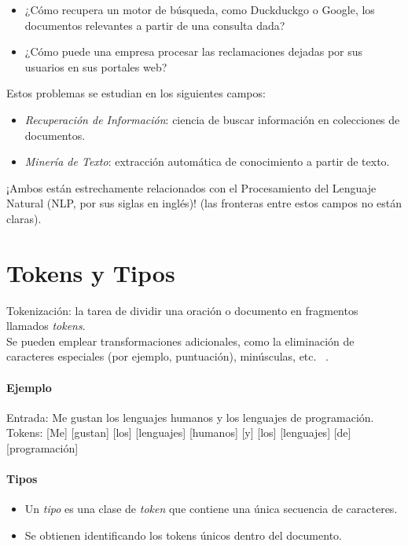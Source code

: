 
\begin{itemize}
   \item ¿Cómo recupera un motor de búsqueda, como Duckduckgo o Google, los documentos relevantes a partir de una consulta dada?
   \item ¿Cómo puede una empresa procesar las reclamaciones dejadas por sus usuarios en sus portales web?
\end{itemize}

Estos problemas se estudian en los siguientes campos:

\begin{itemize}
   \item \emph{Recuperación de Información}: ciencia de buscar información en colecciones de documentos.
   \item \emph{Minería de Texto}: extracción automática de conocimiento a partir de texto.
\end{itemize}

¡Ambos están estrechamente relacionados con el Procesamiento del Lenguaje Natural (NLP, por sus siglas en inglés)! (las fronteras entre estos campos no están claras).

\section{Tokens y Tipos}

Tokenización: la tarea de dividir una oración o documento en fragmentos llamados \emph{tokens}. \\
Se pueden emplear transformaciones adicionales, como la eliminación de caracteres especiales (por ejemplo, puntuación), minúsculas, etc. ~\cite{manning2008}.

\paragraph{Ejemplo}
Entrada: Me gustan los lenguajes humanos y los lenguajes de programación.\\
Tokens: [Me] [gustan] [los] [lenguajes] [humanos] [y] [los] [lenguajes] [de] [programación]


\paragraph{Tipos}
\begin{itemize}
\item Un \emph{tipo} es una clase de \emph{token} que contiene una única secuencia de caracteres.
\item Se obtienen identificando los tokens únicos dentro del documento.
\end{itemize}


